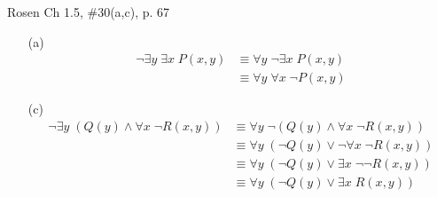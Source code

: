 \documentclass[12pt,addpoints]{exam}
\begin{document}
\begin{questions}
\question Rosen Ch 1.5, \#30(a,c), p. 67
    \ifprintanswers
        \vspace{-10pt}
    \fi
\begin{solution}
    \begin{itemize}[itemsep=0pt,parsep=0pt,topsep=0pt,partopsep=0pt]
        \item[(a)]
        \vspace{-25pt}
        \begin{align*}
          \neg \exists y\; \exists x\; P(x,y) & \equiv \forall y\; \neg \exists x\; P(x,y) \\
          & \equiv \forall y\; \forall x\; \neg P(x,y)
        \end{align*}
        \item[(c)]
        \vspace{-25pt}
        \begin{align*}
          \neg \exists y\; (Q(y) \wedge \forall x\; \neg R(x,y)) & \equiv \forall y\; \neg(Q(y) \wedge \forall x\; \neg R(x,y)) \\
          & \equiv \forall y\; (\neg Q(y) \vee \neg \forall x\; \neg R(x,y)) \\
          & \equiv \forall y\; (\neg Q(y) \vee \exists x\; \neg \neg R(x,y))\\
          & \equiv \forall y\; (\neg Q(y) \vee \exists x\; R(x,y))
        \end{align*}

\end{itemize}
\end{solution}
\end{questions}
\end{document}
